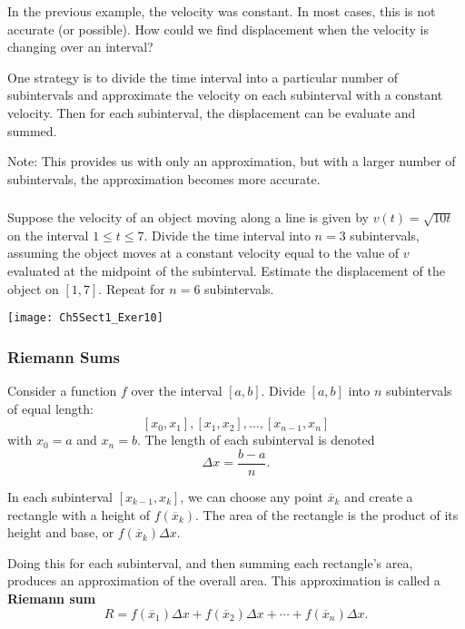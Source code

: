 \documentclass[14pt]{beamer}
\begin{document}
\begin{frame}
\small
In the previous example, the velocity was constant.  In most cases, this is not accurate (or possible).  How could we find displacement when the velocity is changing over an interval?

\bigskip

One strategy is to divide the time interval into a particular number of subintervals and approximate the velocity on each subinterval with a constant velocity.  Then for each subinterval, the displacement can be evaluate and summed.

\bigskip

Note:  This provides us with only an approximation, but with a larger number of subintervals, the approximation becomes more accurate.
\end{frame}

\begin{frame}
\frametitle{}
\footnotesize
\begin{ex} Suppose the velocity of an object moving along a line is given by $v(t)=\sqrt{10t}$ on the interval $1 \le t \le 7$.  Divide the time interval into $n=3$ subintervals, assuming the object moves at a constant velocity equal to the value of $v$ evaluated at the midpoint of the subinterval.  Estimate the displacement of the object on $[1,7]$.  Repeat for $n=6$ subintervals. \end{ex}

\vspace{-0.5pc}
\begin{center}
\texttt{[image: Ch5Sect1\_Exer10]}
\end{center}
\end{frame}

\begin{frame}
\frametitle{\small Riemann Sums}
\small


Consider a function $f$ over the interval $[a,b]$.  Divide $[a,b]$ into $n$ subintervals of equal length:
\[[x_0,x_1], [x_1,x_2], \dots, [x_{n-1},x_n]\]
with $x_0=a$ and $x_n=b$.  The length of each subinterval is denoted
\[\Delta x = \frac{b-a}{n}.\]
\end{frame}

\begin{frame}
\small
In each subinterval $[x_{k-1}, x_k]$, we can choose any point $\overline{x}_k$ and create a rectangle with a height of $f(\overline{x}_k)$.
The area of the rectangle is the product of its height and base, or $f(\overline{x}_k)\Delta x$.

\vspace{1pc}
Doing this for each subinterval, and then summing each rectangle's area, produces an approximation of the overall area.  This approximation is called a {\bf Riemann sum}
\[R=f(\overline{x}_1)\Delta x + f(\overline{x}_2)\Delta x + \cdots + f(\overline{x}_n)\Delta x.\]
\end{frame}
\end{document}
